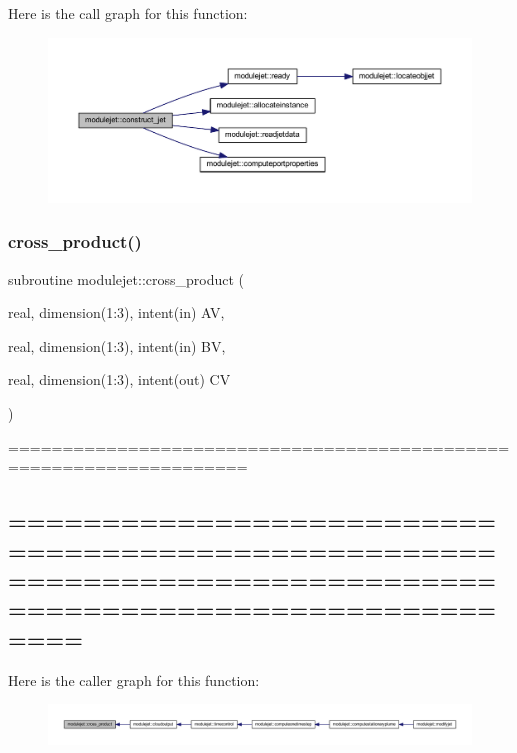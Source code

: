 Here is the call graph for this function\+:\nopagebreak
\begin{figure}[H]
\begin{center}
\leavevmode
\includegraphics[width=350pt]{namespacemodulejet_abc7edc1751a89ee8c640aaea045a3d01_cgraph}
\end{center}
\end{figure}
\mbox{\label{namespacemodulejet_a2cbc865fd41278d7ee8a6b0036bc3114}} 
\subsubsection{\texorpdfstring{cross\+\_\+product()}{cross\_product()}}
{\footnotesize\ttfamily subroutine modulejet\+::cross\+\_\+product (\begin{DoxyParamCaption}\item[{real, dimension(1\+:3), intent(in)}]{AV,  }\item[{real, dimension(1\+:3), intent(in)}]{BV,  }\item[{real, dimension(1\+:3), intent(out)}]{CV }\end{DoxyParamCaption})\hspace{0.3cm}{\ttfamily [private]}}



==================================================================== 

\subsection*{============================================================================================================ }Here is the caller graph for this function\+:\nopagebreak
\begin{figure}[H]
\begin{center}
\leavevmode
\includegraphics[width=350pt]{namespacemodulejet_a2cbc865fd41278d7ee8a6b0036bc3114_icgraph}
\end{center}
\end{figure}
\mbox{\label{namespacemodulejet_aed198ff7ee371124ec0afa1cd4cfe116}} 
